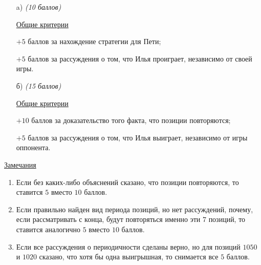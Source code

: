 \begin{enumerate}
    \item[a)] \textit{(10 баллов)} 

	\underline{Общие критерии}

	$+5$ баллов за нахождение стратегии для Пети;
	
	$+5$ баллов за рассуждения о том, что Илья проиграет, независимо от своей игры.

	\item[б)]  \textit{(15 баллов)} 
	
	\underline{Общие критерии}
	
	$+10$ баллов за доказательство того факта, что позиции повторяются;
	
	$+5$ баллов за рассуждения о том, что Илья выиграет, независимо от игры оппонента.
\end{enumerate}
	\underline{Замечания} 
\begin{enumerate}
	\item Если без каких-либо объяснений сказано, что позиции повторяются, то
	ставится $5$ вместо $10$ баллов.
	
	\item Если правильно найден вид периода позиций, но нет рассуждений, 
	почему, если рассматривать с конца, будут повторяться именно эти $7$ позиций,
	то ставится аналогично $5$ вместо $10$ баллов.
	
	\item Если все рассуждения о периодичности сделаны верно, но 
	для позиций $1050$ и $1020$ сказано, что хотя бы одна выигрышная,
	то снимается все $5$ баллов.  
\end{enumerate}
